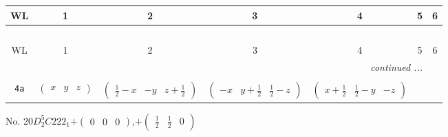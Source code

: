\documentclass[fleqn,9pt,landscape]{jsarticle}
\begin{document}
\begin{center}
\renewcommand{\arraystretch}{1.2}
\begin{longtable}{ccccccc}
 \hline \hline
WL & 1 & 2 & 3 & 4 & 5 & 6 \\ \hline \endfirsthead

\multicolumn{6}{l}{\tablename\ \thetable{}} \\
 \hline \hline
WL & 1 & 2 & 3 & 4 & 5 & 6 \\ \hline \endhead

 \hline \hline
\multicolumn{6}{r}{\footnotesize\it continued ...} \\ \endfoot

 \hline \hline
\multicolumn{6}{r}{} \\ \endlastfoot

{\tt 4a} & $ \begin{pmatrix} x & y & z \end{pmatrix} $ & $ \begin{pmatrix} \frac{1}{2} - x & - y & z + \frac{1}{2} \end{pmatrix} $ & $ \begin{pmatrix} - x & y + \frac{1}{2} & \frac{1}{2} - z \end{pmatrix} $ & $ \begin{pmatrix} x + \frac{1}{2} & \frac{1}{2} - y & - z \end{pmatrix} $ \\
\end{longtable}
\end{center}
\newpage
No. 20\quad$D_{2}^{5}$\quad$C222_1$\quad[ orthorhombic ]\quad$+\begin{pmatrix} 0 & 0 & 0 \end{pmatrix}$,\quad $+\begin{pmatrix} \frac{1}{2} & \frac{1}{2} & 0 \end{pmatrix}$
\end{document}
